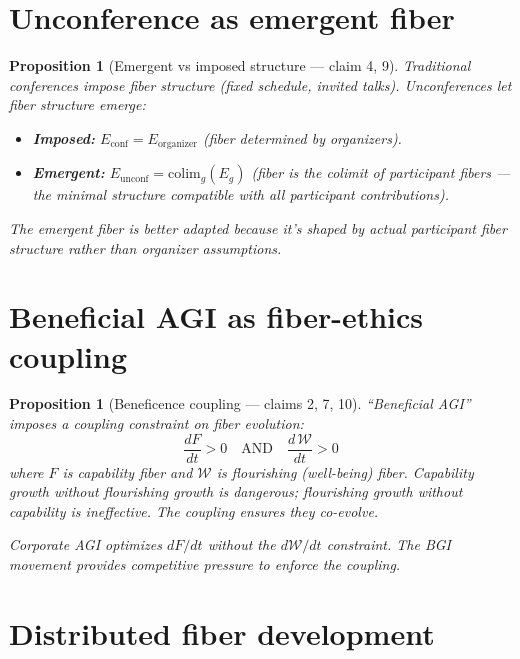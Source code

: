 \documentclass[11pt,a4paper]{article}
\newtheorem{proposition}[definition]{Proposition}
\begin{document}
\section{Unconference as emergent fiber}

\begin{proposition}[Emergent vs imposed structure --- claim 4, 9]
\label{prop:emergent}
Traditional conferences impose fiber structure (fixed schedule, invited
talks). Unconferences let fiber structure emerge:
\begin{itemize}
  \item \textbf{Imposed:} $E_{\text{conf}} = E_{\text{organizer}}$
    (fiber determined by organizers).
  \item \textbf{Emergent:} $E_{\text{unconf}} = \text{colim}_g(E_g)$
    (fiber is the colimit of participant fibers --- the minimal
    structure compatible with all participant contributions).
\end{itemize}
The emergent fiber is better adapted because it's shaped by actual
participant fiber structure rather than organizer assumptions.
\end{proposition}

\section{Beneficial AGI as fiber-ethics coupling}

\begin{proposition}[Beneficence coupling --- claims 2, 7, 10]
\label{prop:beneficial}
``Beneficial AGI'' imposes a coupling constraint on fiber evolution:
\[
  \frac{dF}{dt} > 0 \quad \text{AND} \quad
  \frac{d\,\mathcal{W}}{dt} > 0
\]
where $F$ is capability fiber and $\mathcal{W}$ is flourishing
(well-being) fiber. Capability growth without flourishing growth is
dangerous; flourishing growth without capability is ineffective.
The coupling ensures they co-evolve.

Corporate AGI optimizes $dF/dt$ without the $d\mathcal{W}/dt$ constraint.
The BGI movement provides competitive pressure to enforce the coupling.
\end{proposition}


\section{Distributed fiber development}
\end{document}
